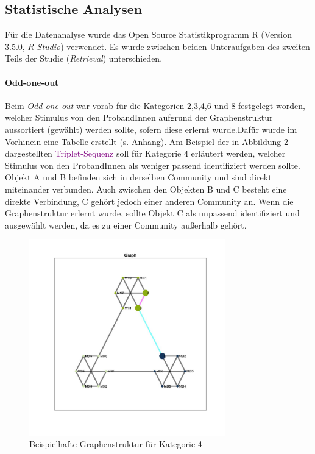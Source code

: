 \subsection{Statistische Analysen}
Für die Datenanalyse wurde das Open Source Statistikprogramm R (Version 3.5.0, \textit{R Studio}) verwendet.
Es wurde zwischen beiden Unteraufgaben des zweiten Teils der Studie (\textit{Retrieval}) unterschieden.

\paragraph{Odd-one-out}
Beim \textit{Odd-one-out} war vorab für die Kategorien 2,3,4,6 und 8 festgelegt worden, welcher Stimulus von den ProbandInnen aufgrund der Graphenstruktur aussortiert (gewählt) werden sollte, sofern diese erlernt wurde.Dafür wurde im Vorhinein eine Tabelle erstellt (s. Anhang). Am Beispiel der in Abbildung 2 dargestellten \textcolor{purple}{Triplet-Sequenz} soll für Kategorie 4 erläutert werden, welcher Stimulus von den ProbandInnen als weniger passend identifiziert werden sollte. Objekt A und B befinden sich in derselben Community und sind direkt miteinander verbunden. Auch zwischen den Objekten B und C besteht eine direkte Verbindung, C gehört jedoch einer anderen Community an. Wenn die Graphenstruktur erlernt wurde, sollte Objekt C als unpassend identifiziert und ausgewählt werden, da es zu einer Community außerhalb gehört.

\begin{figure}[h]
    \centering
    \includegraphics[width=85mm]{cat04_2716_tripletVisual.jpg}
    \caption{Beispielhafte Graphenstruktur für Kategorie 4}
    \label{fig:my_label}
\end{figure}


